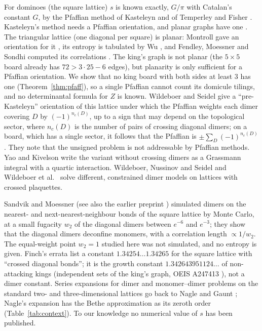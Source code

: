 \documentclass[11pt]{amsart}
\theoremstyle{definition}
\theoremstyle{remark}
\begin{document}
For dominoes (the square lattice) $s$ is known exactly, $G/\pi$ with Catalan's constant $G$, by
the Pfaffian method of Kasteleyn and of Temperley and Fisher \cite{kasteleyn1961,
temperleyfisher1961}. Kasteleyn's method needs a Pfaffian orientation, and planar graphs have
one \cite[Thm.~8.3.4]{lovaszplummer1986}. The triangular lattice (one diagonal per square) is
planar: Montroll gave an orientation for it \cite{montroll1964}, its entropy is tabulated by Wu
\cite{wu2006}, and Fendley, Moessner and Sondhi computed its correlations \cite{fms2002}. The
king's graph is not planar (the
$5 \times 5$ board already has $72 > 3\cdot 25 - 6$ edges), but planarity is only sufficient for a
Pfaffian orientation. We show that no king board with both sides at least $3$ has one
(Theorem~\ref{thm:pfaff}), so a single Pfaffian cannot count its domicule tilings, and no
determinantal formula for $Z$ is known. Wildeboer and Seidel \cite{wildeboerseidel2020} give a
``pre-Kasteleyn'' orientation of this lattice under which the Pfaffian weights each dimer
covering $D$ by $(-1)^{n_c(D)}$, up to a sign that may depend on the topological sector, where
$n_c(D)$ is the number of pairs of crossing diagonal dimers; on a board, which has a single
sector, it follows that the Pfaffian is
$\pm\sum_D (-1)^{n_c(D)}$. They note that the unsigned problem is not
addressable by Pfaffian methods. Yao and Kivelson \cite{yaokivelson2012} write the variant without
crossing dimers as a Grassmann integral with a quartic interaction. Wildeboer, Nussinov and Seidel
\cite{wildeboernussinovseidel2020} and Wildeboer et al.\ \cite{wildeboer2026} solve different,
constrained dimer models on lattices with crossed plaquettes.

Sandvik and Moessner \cite{sandvikmoessner2006} (see also the earlier preprint \cite{sandvik2003})
simulated dimers on the nearest- and next-nearest-neighbour bonds of the square lattice by Monte
Carlo, at a small fugacity $w_2$ of the diagonal dimers between $e^{-6}$ and $e^{-3}$; they show
that the diagonal dimers deconfine monomers, with a correlation length $\propto 1/w_2$. The
equal-weight point $w_2 = 1$ studied here was not simulated, and no entropy is given. Finch's
errata \cite[first volume, \S 5.12]{finch2020errata} list a constant $1.34254\ldots 1.34265$ for
the square lattice with ``crossed diagonal bonds''; it is the growth constant $1.342643951124\ldots$ of
non-attacking kings (independent sets of the king's graph, OEIS A247413 \cite{oeisA247413}), not a
dimer constant. Series expansions for dimer and monomer--dimer problems on the standard two- and
three-dimensional lattices go back to Nagle \cite{nagle1966} and Gaunt \cite{gaunt1969}; Nagle's
expansion has the Bethe approximation as its zeroth order (Table~\ref{tab:context}). To our
knowledge no numerical value of $s$ has been published.
\end{document}
